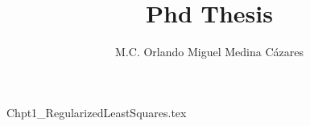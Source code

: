 \documentclass[letterpaper,11pt]{book}
\title{Phd Thesis}
\author{M.C. Orlando Miguel Medina C\'azares}
\begin{document}
\maketitle


\clearpage
\thispagestyle{empty}

\tableofcontents

\mainmatter
{Chpt1_RegularizedLeastSquares.tex}


\end{document}
